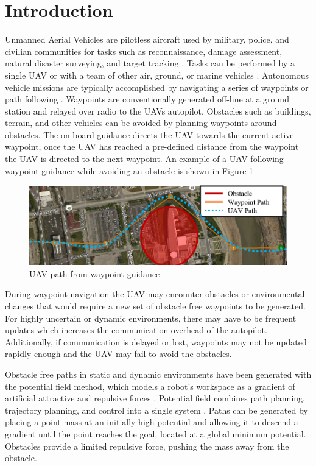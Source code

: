 \documentclass[conf]{new-aiaa}
\begin{document}
\section{Introduction}
Unmanned Aerial Vehicles are pilotless aircraft used by military, police, and civilian communities for tasks such as reconnaissance, damage assessment, natural disaster surveying, and target tracking \cite{ariyur_autonomous_2008,teuliere_chasing_2011}. Tasks can be performed by a single UAV or with a team of other air, ground, or marine vehicles \cite{oh_coordinated_2013,hyondong_oh_coordinated_2015,ulun_coordinated_2013}. Autonomous vehicle missions are typically accomplished by navigating a series of waypoints \cite{ariyur_autonomous_2008} or path following \cite{oliveira_moving_2016}. Waypoints are conventionally generated off-line at a ground station and relayed over radio to the UAVs autopilot. Obstacles such as buildings, terrain, and other vehicles can be avoided by planning waypoints around obstacles. The on-board guidance directs the UAV towards the current active waypoint, once the UAV has reached a pre-defined distance from the waypoint the UAV is directed to the next waypoint. An example of a UAV following waypoint guidance while avoiding an obstacle is shown in Figure \ref{fig:simplewaypointsWithUAVPath}


\begin{figure}[H]
	\centering
	\includegraphics[width=1\linewidth]{Figures/simpleWaypointsWithUAVPath}
	\caption{UAV path from waypoint guidance}
	\label{fig:simplewaypointsWithUAVPath}
\end{figure}


During waypoint navigation the UAV may encounter obstacles or environmental changes that would require a new set of obstacle free waypoints to be generated. For highly uncertain or dynamic environments, there may have to be frequent updates which increases the communication overhead of the autopilot. Additionally, if communication is delayed or lost, waypoints may not be updated rapidly enough and the UAV may fail to avoid the obstacles.


Obstacle free paths in static and dynamic environments have been generated with the potential field method, which models a robot's workspace as a gradient of artificial attractive and repulsive forces \cite{khatib_real-time_1986}. Potential field combines path planning, trajectory planning, and control into a single system \cite{rimon_exact_1992}. Paths can be generated by placing a point mass at an initially high potential and allowing it to descend a gradient until the point reaches the goal, located at a global minimum potential. Obstacles provide a limited repulsive force, pushing the mass away from the obstacle. 
\end{document}
